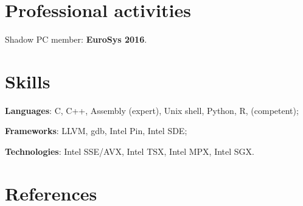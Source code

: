 \documentclass[letterpaper]{article}
\renewenvironment{itemize}{
  \begin{list}{}{
    \setlength{\leftmargin}{1.5em}
  }
}{
  \end{list}
}
\begin{document}
\section*{Professional activities}


\begin{itemize}
 \item { Shadow PC member:} {\bf EuroSys 2016}.
\end{itemize}
  




\section*{Skills}
\begin{itemize}
	\item {\bf Languages}: C, C++, Assembly (expert), Unix shell, Python, R, (competent);
	\item {\bf Frameworks}: LLVM, gdb, Intel Pin, Intel SDE;
	\item {\bf Technologies}: Intel SSE/AVX, Intel TSX, Intel MPX, Intel SGX.
\end{itemize}


\section*{References}
\end{document}
